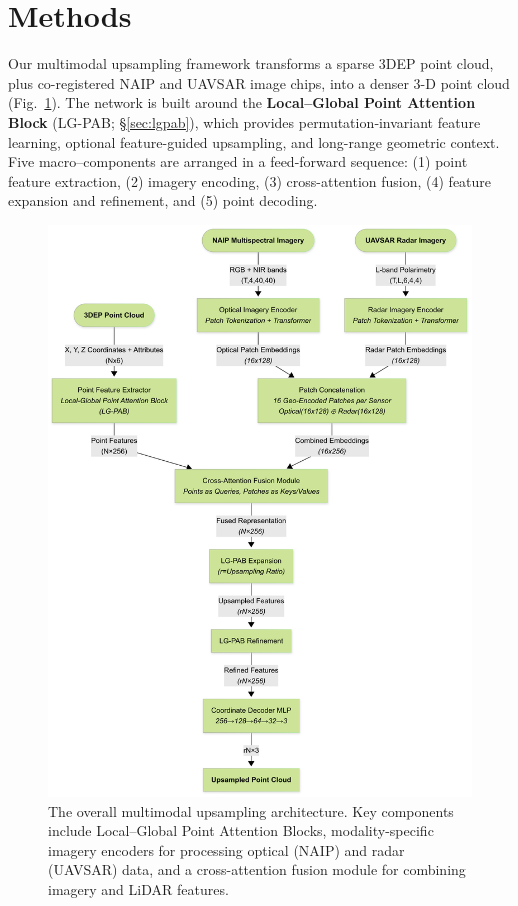 \documentclass[preprint,12pt,authoryear]{elsarticle}
\begin{document}
\section{Methods}
Our multimodal upsampling framework transforms a sparse 3DEP point cloud, plus co-registered NAIP and UAVSAR image chips, into a denser 3-D point cloud (Fig.~\ref{fig:pipeline}).  
The network is built around the \textbf{Local–Global Point Attention Block} (LG-PAB; §\ref{sec:lgpab}), which provides permutation‐invariant feature learning, optional feature-guided upsampling, and long-range geometric context.  
Five macro–components are arranged in a feed-forward sequence:  
(1) point feature extraction, (2) imagery encoding, (3) cross-attention fusion, (4) feature expansion and refinement, and (5) point decoding.

\begin{figure}
    \centering
    \includegraphics[width=1\linewidth]{manuscript/figures/Overall_Architecture.png}
    \caption{The overall multimodal upsampling architecture. Key components include Local–Global Point Attention Blocks, modality-specific imagery encoders for processing optical (NAIP) and radar (UAVSAR) data, and a cross-attention fusion module for combining imagery and LiDAR features.}
    \label{fig:pipeline}
\end{figure}
\end{document}
